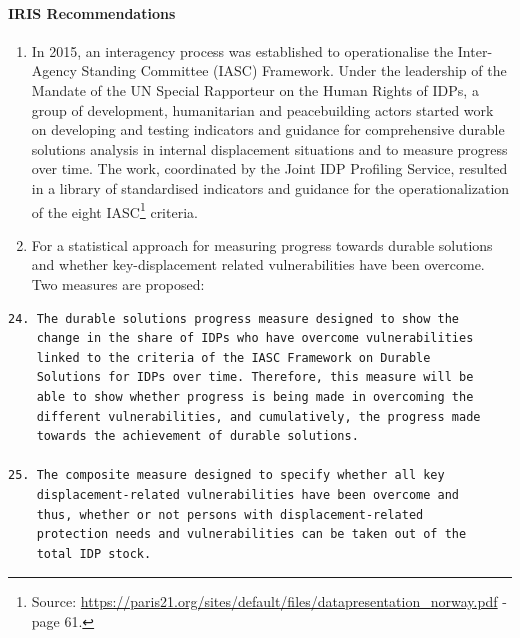 \documentclass[
]{article}
\begin{document}
\hypertarget{iris-recommendations}{%
\paragraph{IRIS Recommendations}\label{iris-recommendations}}

\begin{enumerate}
\def\labelenumi{\arabic{enumi}.}
\setcounter{enumi}{434}
\item
  In 2015, an interagency process was established to operationalise
  the Inter-Agency Standing Committee (IASC) Framework. Under the
  leadership of the Mandate of the UN Special Rapporteur on the Human
  Rights of IDPs, a group of development, humanitarian and
  peacebuilding actors started work on developing and testing
  indicators and guidance for comprehensive durable solutions analysis
  in internal displacement situations and to measure progress over
  time. The work, coordinated by the Joint IDP Profiling Service,
  resulted in a library of standardised indicators and guidance for
  the operationalization of the eight IASC\footnote{Source:
    \url{https://paris21.org/sites/default/files/datapresentation_norway.pdf}
    - page 61.} criteria.
\item
  For a statistical approach for measuring progress towards durable
  solutions and whether key-displacement related vulnerabilities have
  been overcome. Two measures are proposed:
\end{enumerate}

\begin{verbatim}
24. The durable solutions progress measure designed to show the
    change in the share of IDPs who have overcome vulnerabilities
    linked to the criteria of the IASC Framework on Durable
    Solutions for IDPs over time. Therefore, this measure will be
    able to show whether progress is being made in overcoming the
    different vulnerabilities, and cumulatively, the progress made
    towards the achievement of durable solutions.

25. The composite measure designed to specify whether all key
    displacement-related vulnerabilities have been overcome and
    thus, whether or not persons with displacement-related
    protection needs and vulnerabilities can be taken out of the
    total IDP stock.
\end{verbatim}
\end{document}
